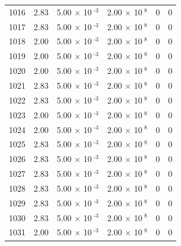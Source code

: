 \documentclass[a4paper,11pt]{article}
\begin{document}
\begin{center}
\begin{longtable}{|R{1.5cm}|R{2.4cm}|R{2.4cm}|R{2.4cm}|R{2.4cm}|R{2.4cm}|}
 1016 &   2.83  &         5.00 $\times$ 10$^{\text{          -3}}$  &         2.00 $\times$ 10$^{\text{           8}}$  & 0  & 0 \\
 1017 &   2.83  &         5.00 $\times$ 10$^{\text{          -3}}$  &         2.00 $\times$ 10$^{\text{           8}}$  & 0  & 0 \\
 1018 &   2.00  &         5.00 $\times$ 10$^{\text{          -3}}$  &         2.00 $\times$ 10$^{\text{           8}}$  & 0  & 0 \\
 1019 &   2.00  &         5.00 $\times$ 10$^{\text{          -3}}$  &         2.00 $\times$ 10$^{\text{           8}}$  & 0  & 0 \\
 1020 &   2.00  &         5.00 $\times$ 10$^{\text{          -3}}$  &         2.00 $\times$ 10$^{\text{           8}}$  & 0  & 0 \\
 1021 &   2.83  &         5.00 $\times$ 10$^{\text{          -3}}$  &         2.00 $\times$ 10$^{\text{           8}}$  & 0  & 0 \\
 1022 &   2.83  &         5.00 $\times$ 10$^{\text{          -3}}$  &         2.00 $\times$ 10$^{\text{           8}}$  & 0  & 0 \\
 1023 &   2.00  &         5.00 $\times$ 10$^{\text{          -3}}$  &         2.00 $\times$ 10$^{\text{           8}}$  & 0  & 0 \\
 1024 &   2.00  &         5.00 $\times$ 10$^{\text{          -3}}$  &         2.00 $\times$ 10$^{\text{           8}}$  & 0  & 0 \\
 1025 &   2.83  &         5.00 $\times$ 10$^{\text{          -3}}$  &         2.00 $\times$ 10$^{\text{           8}}$  & 0  & 0 \\
 1026 &   2.83  &         5.00 $\times$ 10$^{\text{          -3}}$  &         2.00 $\times$ 10$^{\text{           8}}$  & 0  & 0 \\
 1027 &   2.83  &         5.00 $\times$ 10$^{\text{          -3}}$  &         2.00 $\times$ 10$^{\text{           8}}$  & 0  & 0 \\
 1028 &   2.83  &         5.00 $\times$ 10$^{\text{          -3}}$  &         2.00 $\times$ 10$^{\text{           8}}$  & 0  & 0 \\
 1029 &   2.83  &         5.00 $\times$ 10$^{\text{          -3}}$  &         2.00 $\times$ 10$^{\text{           8}}$  & 0  & 0 \\
 1030 &   2.83  &         5.00 $\times$ 10$^{\text{          -3}}$  &         2.00 $\times$ 10$^{\text{           8}}$  & 0  & 0 \\
 1031 &   2.00  &         5.00 $\times$ 10$^{\text{          -3}}$  &         2.00 $\times$ 10$^{\text{           8}}$  & 0  & 0 \\

\end{longtable}
\end{center}
\end{document}
